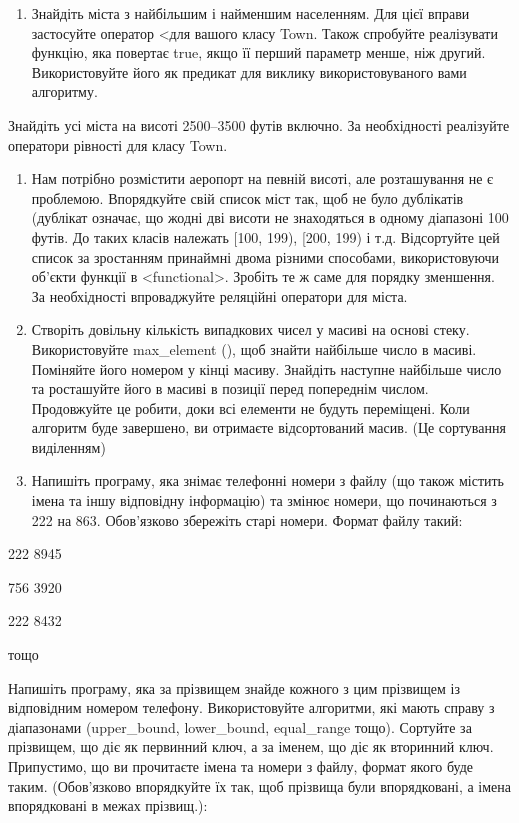 \documentclass[]{article}
\makeatletter
\newcommand{\xslalph}[1]{\expandafter\@xslalph\csname c@#1\endcsname}
\newcommand{\@xslalph}[1]{%
    \ifcase#1\or а\or б\or в\or г\or д\or e\or є\or ж\or з\or i%
    \or й\or к\or л\or м\or н\or о\or п\or р\or с\or т%
    \or у\or ф\or х\or ц\or ч\or ш\or ю\or я\or аа\or бб\or вв%
    \else\@ctrerr\fi%
}
\makeatother
\begin{document}
\begin{enumerate}
\begin{enumerate}[label=\xslalph*)]
\begin{enumerate}
\begin{enumerate}[label=\xslalph*)]
\begin{enumerate}
\def\labelenumi{\arabic{enumi})}
\item
  Знайдіть міста з найбільшим і найменшим населенням. Для цієї вправи
  застосуйте оператор \textless{}для вашого класу Town. Також спробуйте
  реалізувати функцію, яка повертає true, якщо її перший параметр менше,
  ніж другий. Використовуйте його як предикат для виклику
  використовуваного вами алгоритму.
\end{enumerate}

Знайдіть усі міста на висоті 2500--3500 футів включно. За необхідності
реалізуйте оператори рівності для класу Town.

\begin{enumerate}
\def\labelenumi{\arabic{enumi})}
\item
  Нам потрібно розмістити аеропорт на певній висоті, але розташування не
  є проблемою. Впорядкуйте свій список міст так, щоб не було дублікатів
  (дублікат означає, що жодні дві висоти не знаходяться в одному
  діапазоні 100 футів. До таких класів належать {[}100, 199), {[}200,
  199) і т.д. Відсортуйте цей список за зростанням принаймні двома
  різними способами, використовуючи об'єкти функції в
  \textless{}functional\textgreater{}. Зробіть те ж саме для порядку
  зменшення. За необхідності впроваджуйте реляційні оператори для міста.
\item
  Створіть довільну кількість випадкових чисел у масиві на основі стеку.
  Використовуйте max\_element (), щоб знайти найбільше число в масиві.
  Поміняйте його номером у кінці масиву. Знайдіть наступне найбільше
  число та росташуйте його в масиві в позиції перед попереднім числом.
  Продовжуйте це робити, доки всі елементи не будуть переміщені. Коли
  алгоритм буде завершено, ви отримаєте відсортований масив. (Це
  сортування виділенням)
\item
  Напишіть програму, яка знімає телефонні номери з файлу (що також
  містить імена та іншу відповідну інформацію) та змінює номери, що
  починаються з 222 на 863. Обов'язково збережіть старі номери. Формат
  файлу такий:
\end{enumerate}

222 8945

756 3920

222 8432

тощо

Напишіть програму, яка за прізвищем знайде кожного з цим прізвищем із
відповідним номером телефону. Використовуйте алгоритми, які мають справу
з діапазонами (upper\_bound, lower\_bound, equal\_range тощо). Сортуйте
за прізвищем, що діє як первинний ключ, а за іменем, що діє як вторинний
ключ. Припустимо, що ви прочитаєте імена та номери з файлу, формат якого
буде таким. (Обов'язково впорядкуйте їх так, щоб прізвища були
впорядковані, а імена впорядковані в межах прізвищ.):


\end{enumerate}
\end{enumerate}
\end{enumerate}
\end{enumerate}
\end{document}
